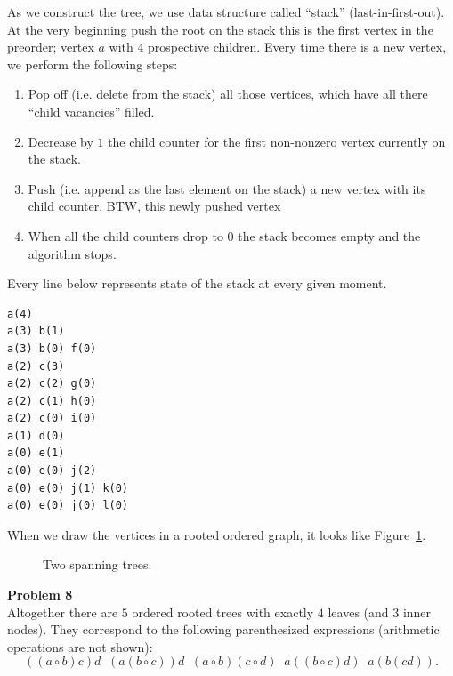 \documentclass[jou]{apa6}
\begin{document}
As we construct the tree, we use data structure called ``stack''
(last-in-first-out). 
At the very beginning push the root on the stack \textendash{} 
this is the first vertex in the preorder; vertex $a$ with $4$ prospective children.
Every time there is a new vertex, we perform the following steps: 
\begin{enumerate}[(1)]
\item Pop off (i.e. delete from the stack) all those vertices, which
have all there ``child vacancies'' filled. 
\item Decrease by $1$ the child counter for the first non-nonzero vertex currently on the stack. 
\item Push (i.e. append as the last element on the stack) a new vertex with its child counter. 
BTW, this newly pushed vertex 
\item When all the child counters drop to $0$ the stack becomes empty and the algorithm stops.
\end{enumerate}

Every line below represents state of the stack at every given moment.

\begin{verbatim}
a(4)
a(3) b(1) 
a(3) b(0) f(0)
a(2) c(3)
a(2) c(2) g(0)
a(2) c(1) h(0)
a(2) c(0) i(0)
a(1) d(0)
a(0) e(1)
a(0) e(0) j(2) 
a(0) e(0) j(1) k(0)
a(0) e(0) j(0) l(0)
\end{verbatim}

When we draw the vertices in a rooted ordered graph, it looks like 
Figure~\ref{fig:tree0}.

\begin{figure}[!htb]
\caption{\label{fig:tree0} Two spanning trees.}
\end{figure}



{\bf Problem 8}\\
Altogether there are $5$ ordered rooted trees with exactly $4$ leaves (and $3$ inner nodes). 
They correspond to the following parenthesized expressions (arithmetic operations are not shown):
$$((a\circ{}b)c)d\;\;(a(b\circ{}c))d\;\;(a\circ{}b)(c\circ{}d)\;\;a((b\circ{}c)d)\;\;a(b(cd)).$$
\end{document}
